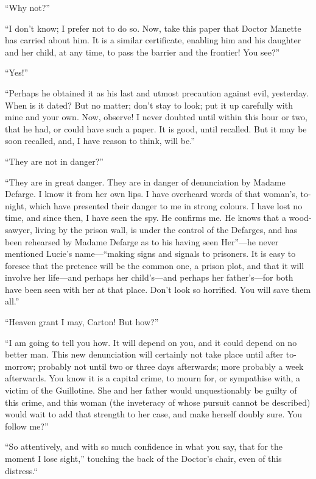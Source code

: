 ``Why not?''

``I don't know; I prefer not to do so.  Now, take this paper that
Doctor Manette has carried about him.  It is a similar certificate,
enabling him and his daughter and her child, at any time, to pass the
barrier and the frontier!  You see?''

``Yes!''

``Perhaps he obtained it as his last and utmost precaution against
evil, yesterday.  When is it dated?  But no matter; don't stay to look;
put it up carefully with mine and your own.  Now, observe!  I never
doubted until within this hour or two, that he had, or could have
such a paper. It is good, until recalled.  But it may be soon recalled,
and, I have reason to think, will be.''

``They are not in danger?''

``They are in great danger.  They are in danger of denunciation by
Madame Defarge.  I know it from her own lips.  I have overheard words
of that woman's, to-night, which have presented their danger to me in
strong colours.  I have lost no time, and since then, I have seen the
spy. He confirms me.  He knows that a wood-sawyer, living by the
prison wall, is under the control of the Defarges, and has been
rehearsed by Madame Defarge as to his having seen Her''---he never
mentioned Lucie's name---``making signs and signals to prisoners.
It is easy to foresee that the pretence will be the common one, a
prison plot, and that it will involve her life---and perhaps her
child's---and perhaps her father's---for both have been seen with her
at that place.  Don't look so horrified.  You will save them all.''

``Heaven grant I may, Carton!  But how?''

``I am going to tell you how.  It will depend on you, and it could
depend on no better man.  This new denunciation will certainly not
take place until after to-morrow; probably not until two or three
days afterwards; more probably a week afterwards.  You know it is a
capital crime, to mourn for, or sympathise with, a victim of the
Guillotine.  She and her father would unquestionably be guilty of
this crime, and this woman (the inveteracy of whose pursuit cannot
be described) would wait to add that strength to her case, and make
herself doubly sure. You follow me?''

``So attentively, and with so much confidence in what you say, that
for the moment I lose sight,'' touching the back of the Doctor's
chair, even of this distress.``

